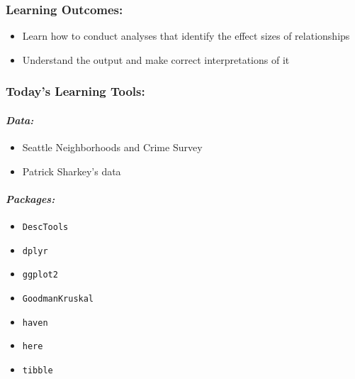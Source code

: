 \documentclass[
]{book}
\providecommand{\tightlist}{%
  \setlength{\itemsep}{0pt}\setlength{\parskip}{0pt}}
\begin{document}
\hypertarget{learning-outcomes-7}{%
\subsubsection*{Learning Outcomes:}\label{learning-outcomes-7}}

\begin{itemize}
\tightlist
\item
  Learn how to conduct analyses that identify the effect sizes of relationships
\item
  Understand the output and make correct interpretations of it
\end{itemize}

\hypertarget{todays-learning-tools-7}{%
\subsubsection*{Today's Learning Tools:}\label{todays-learning-tools-7}}

\hypertarget{data-7}{%
\paragraph*{\texorpdfstring{\emph{Data:}}{Data:}}\label{data-7}}

\begin{itemize}
\tightlist
\item
  Seattle Neighborhoods and Crime Survey
\item
  Patrick Sharkey's data
\end{itemize}

\hypertarget{packages-8}{%
\paragraph*{\texorpdfstring{\emph{Packages:}}{Packages:}}\label{packages-8}}

\begin{itemize}
\tightlist
\item
  \texttt{DescTools}
\item
  \texttt{dplyr}
\item
  \texttt{ggplot2}
\item
  \texttt{GoodmanKruskal}
\item
  \texttt{haven}
\item
  \texttt{here}
\item
  \texttt{tibble}
\end{itemize}
\end{document}
